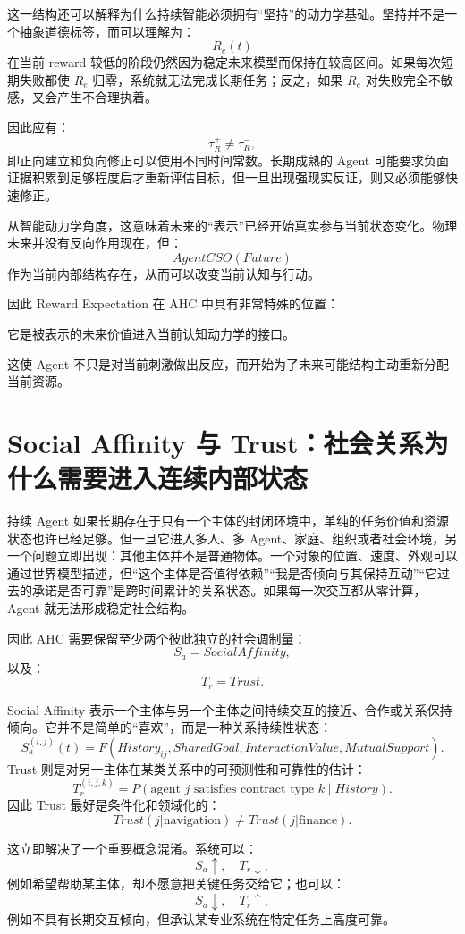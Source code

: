 这一结构还可以解释为什么持续智能必须拥有“坚持”的动力学基础。坚持并不是一个抽象道德标签，而可以理解为：
\[
R_e(t)
\]
在当前 reward 较低的阶段仍然因为稳定未来模型而保持在较高区间。如果每次短期失败都使 \(R_e\) 归零，系统就无法完成长期任务；反之，如果 \(R_e\) 对失败完全不敏感，又会产生不合理执着。

因此应有：
\[
\tau_R^{+}
\neq
\tau_R^{-},
\]
即正向建立和负向修正可以使用不同时间常数。长期成熟的 Agent 可能要求负面证据积累到足够程度后才重新评估目标，但一旦出现强现实反证，则又必须能够快速修正。

从智能动力学角度，这意味着未来的“表示”已经开始真实参与当前状态变化。物理未来并没有反向作用现在，但：
\[
AgentCSO(Future)
\]
作为当前内部结构存在，从而可以改变当前认知与行动。

因此 Reward Expectation 在 AHC 中具有非常特殊的位置：
\begin{statementbox}
它是被表示的未来价值进入当前认知动力学的接口。
\end{statementbox}
这使 Agent 不只是对当前刺激做出反应，而开始为了未来可能结构主动重新分配当前资源。

\section{Social Affinity 与 Trust：社会关系为什么需要进入连续内部状态}

持续 Agent 如果长期存在于只有一个主体的封闭环境中，单纯的任务价值和资源状态也许已经足够。但一旦它进入多人、多 Agent、家庭、组织或者社会环境，另一个问题立即出现：其他主体并不是普通物体。一个对象的位置、速度、外观可以通过世界模型描述，但“这个主体是否值得依赖”“我是否倾向与其保持互动”“它过去的承诺是否可靠”是跨时间累计的关系状态。如果每一次交互都从零计算，Agent 就无法形成稳定社会结构。

因此 AHC 需要保留至少两个彼此独立的社会调制量：
\[
S_a
=
SocialAffinity,
\]
以及：
\[
T_r
=
Trust.
\]

Social Affinity 表示一个主体与另一个主体之间持续交互的接近、合作或关系保持倾向。它并不是简单的“喜欢”，而是一种关系持续性状态：
\[
S_a^{(i,j)}(t)
=
F(
History_{ij},
SharedGoal,
InteractionValue,
MutualSupport
).
\]
Trust 则是对另一主体在某类关系中的可预测性和可靠性的估计：
\[
T_r^{(i,j,k)}
=
P(
\text{agent }j
\text{ satisfies contract type }k
\mid
History
).
\]
因此 Trust 最好是条件化和领域化的：
\[
Trust(j|\mathrm{navigation})
\neq
Trust(j|\mathrm{finance}).
\]

这立即解决了一个重要概念混淆。系统可以：
\[
S_a\uparrow,\quad T_r\downarrow,
\]
例如希望帮助某主体，却不愿意把关键任务交给它；也可以：
\[
S_a\downarrow,\quad T_r\uparrow,
\]
例如不具有长期交互倾向，但承认某专业系统在特定任务上高度可靠。

